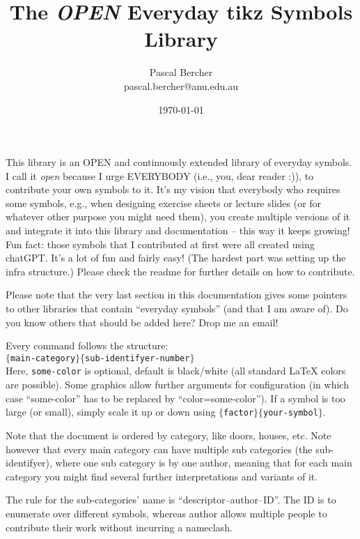 \documentclass{article}
\begin{document}
\title{The \emph{OPEN} Everyday tikz Symbols Library}
\author{Pascal Bercher\\pascal.bercher@anu.edu.au}
\date{\today}

\maketitle

This library is an OPEN and continuously extended library of everyday symbols. I call it \emph{open} because I urge EVERYBODY (i.e., you, dear reader :)), to contribute your own symbols to it. It's my vision that everybody who requires some symbols, e.g., when designing exercise sheets or lecture slides (or for whatever other purpose you might need them), you create multiple versions of it and integrate it into this library and documentation -- this way it keeps growing! Fun fact: those symbols that I contributed at first were all created using chatGPT. It's a lot of fun and fairly easy! (The hardest part was setting up the infra structure.) Please check the readme for further details on how to contribute.

Please note that the very last section in this documentation gives some pointers to other libraries that contain ``everyday symbols'' (and that I am aware of). Do you know others that should be added here? Drop me an email!

\medskip
Every command follows the structure:\\
{\centering
\texttt{\string{}$\{$main-category$\}\{$sub-identifyer-number$\}$}}\\
Here, \texttt{some-color} is optional, default is black/white (all standard \LaTeX{} colors are possible). Some graphics allow further arguments for configuration (in which case ``some-color'' has to be replaced by ``color=some-color''). If a symbol is too large (or small), simply scale it up or down using
\texttt{\string\scalebox$\{$factor$\}\{$your-symbol$\}$}.

\medskip
Note that the document is ordered by category, like doors, houses, etc. Note however that every main category can have multiple sub categories (the sub-identifyer), where one sub category is by one author, meaning that for each main category you might find several further interpretations and variants of it. 

\medskip
The rule for the sub-categories' name is ``descriptor--author--ID''. The ID is to enumerate over different symbols, whereas author allows multiple people to contribute their work without incurring a nameclash.
\end{document}
